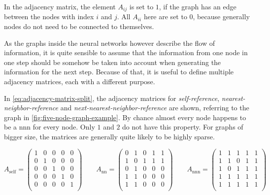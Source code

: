 In the adjacency matrix, the element $A_{ij}$ is set to $1$, if the graph has an edge between the nodes with index $i$ and $j$. 
All $A_{ii}$ here are set to $0$, because generally nodes do not need to be \glqq connected\grqq{} to themselves.

As the graphs inside the neural networks however describe the flow of information, it is quite sensible to assume that the information from one node in one step should be somehow be taken into account when generating the information for the next step.
Because of that, it is useful to define multiple adjacency matrices, each with a different purpose.

In \autoref{eq:adjacency-matrix-split}, the adjacency matrices for \emph{self-reference}, \emph{nearest-neighbor-reference} and \emph{next-nearest-neighbor-reference} are shown, referring to the graph in \autoref{fig:five-node-graph-example}. By chance almost every node happens to be a nnn for every node. Only $1$ and $2$ do not have this property. 
For graphs of bigger size, the matrices are generally quite likely to be highly sparse.

\begin{equation}
    \label{eq:adjacency-matrix-split}
    A_\mathrm{self} = \left(\begin{matrix}
        1 & 0 & 0 & 0 & 0 \\
        0 & 1 & 0 & 0 & 0 \\
        0 & 0 & 1 & 0 & 0 \\
        0 & 0 & 0 & 1 & 0 \\
        0 & 0 & 0 & 0 & 1 \\
    \end{matrix}\right)\qquad
    A_\mathrm{nn} = \left(\begin{matrix}
        0 & 1 & 0 & 1 & 1 \\
        1 & 0 & 1 & 1 & 1 \\
        0 & 1 & 0 & 0 & 0 \\
        1 & 1 & 0 & 0 & 0 \\
        1 & 1 & 0 & 0 & 0 \\
    \end{matrix}\right)\qquad
    A_\mathrm{nnn} = \left(\begin{matrix}
        1 & 1 & 1 & 1 & 1 \\
        1 & 1 & 0 & 1 & 1 \\
        1 & 0 & 1 & 1 & 1 \\
        1 & 1 & 1 & 1 & 1 \\
        1 & 1 & 1 & 1 & 1 \\
    \end{matrix}\right)
\end{equation}


